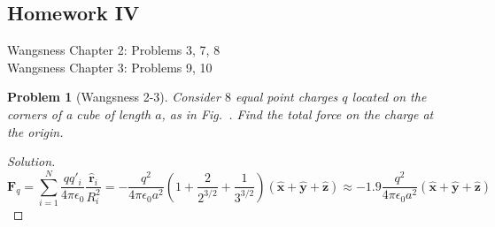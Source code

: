 \documentclass[oneside]{book}
\theoremstyle{mystyle}
\newtheorem{problem}{Problem}[section]
\begin{document}
\subsection{Homework IV}
Wangsness Chapter 2: Problems 3, 7, 8\\
Wangsness Chapter 3: Problems 9, 10
\begin{problem}[Wangsness 2-3]
    Consider $8$ equal point charges $q$ located on the corners of a cube of length $a$, as in Fig.~. Find the total force on the charge at the origin.
\end{problem}
\begin{proof}[Solution]
\begin{equation*}
    \mathbf{F}_q = \sum_{i=1}^{N} \frac{qq'_i}{4\pi \epsilon_0} \frac{\hat{\mathbf{r}}_i}{R_i^2} = -\frac{q^2}{4\pi \epsilon_0 a^2} (1+\frac{2}{2^{3/2}}+\frac{1}{3^{3/2}})(\hat{\mathbf{x}}+\hat{\mathbf{y}}+\hat{\mathbf{z}}) \approx -1.9\frac{q^{2}}{4\pi \epsilon_{0}a^{2}}(\hat{\mathbf{x}}+\hat{\mathbf{y}}+\hat{\mathbf{z}})
\end{equation*}
\end{proof}
\end{document}
